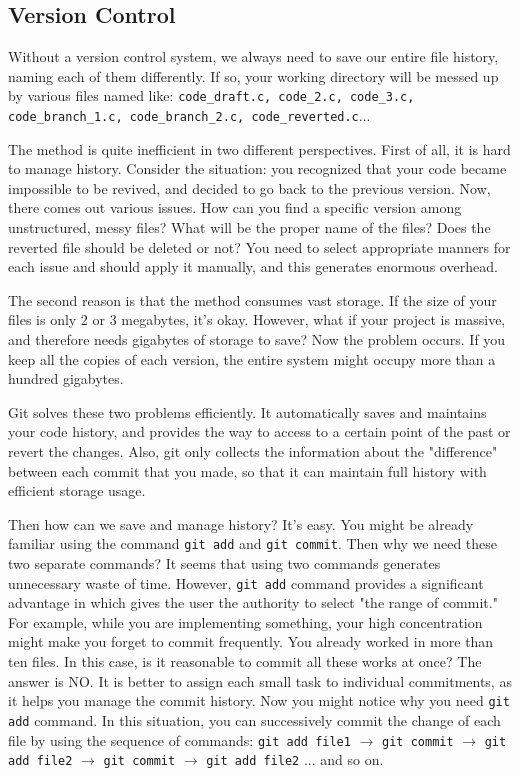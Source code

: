 \documentclass{oblivoir}
\begin{document}
\subsection{Version Control}


Without a version control system, we always need to save our entire file history, naming each of them differently. If so, your working directory will be messed up by various files named like: \texttt{code\_draft.c, code\_2.c, code\_3.c, code\_branch\_1.c, code\_branch\_2.c, code\_reverted.c}...

The method is quite inefficient in two different perspectives. First of all, it is hard to manage history. Consider the situation: you recognized that your code became impossible to be revived, and decided to go back to the previous version. Now, there comes out various issues. How can you find a specific version among unstructured, messy files? What will be the proper name of the files? Does the reverted file should be deleted or not? You need to select appropriate manners for each issue and should apply it manually, and this generates enormous overhead.

The second reason is that the method consumes vast storage. If the size of your files is only 2 or 3 megabytes, it's okay. However, what if your project is massive, and therefore needs gigabytes of storage to save? Now the problem occurs. If you keep all the copies of each version, the entire system might occupy more than a hundred gigabytes. 

Git solves these two problems efficiently. It automatically saves and maintains your code history, and provides the way to access to a certain point of the past or revert the changes. Also, git only collects the information about the "difference" between each commit that you made, so that it can maintain full history with efficient storage usage. 

Then how can we save and manage history? It's easy. You might be already familiar using the command \texttt{git add} and \texttt{git commit}. Then why we need these two separate commands? It seems that using two commands generates unnecessary waste of time. However, \texttt{git add} command provides a significant advantage in which gives the user the authority to select "the range of commit."  For example, while you are implementing something, your high concentration might make you forget to commit frequently. You already worked in more than ten files. In this case, is it reasonable to commit all these works at once? The answer is NO. It is better to assign each small task to individual commitments, as it helps you manage the commit history. Now you might notice why you need \texttt{git add} command. In this situation, you can successively commit the change of each file by using the sequence of commands: \texttt{git add file1} $\rightarrow$ \texttt{git commit} $\rightarrow$ \texttt{git add file2} $\rightarrow$ \texttt{git commit} $\rightarrow$ \texttt{git add file2} ... and so on. 
\end{document}
